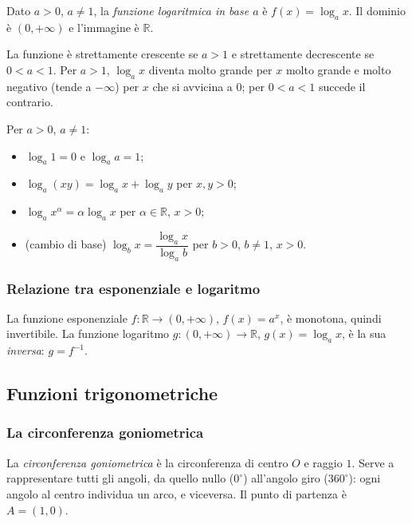 \documentclass[11pt,a4paper]{article}
\begin{document}
\begin{definizione}
Dato $a > 0$, $a \ne 1$, la \emph{funzione logaritmica in base $a$} è $f(x) = \log_a x$. Il dominio è $(0, +\infty)$ e l'immagine è $\mathbb{R}$.
\end{definizione}

La funzione è strettamente crescente se $a > 1$ e strettamente decrescente se $0 < a < 1$. Per $a > 1$, $\log_a x$ diventa molto grande per $x$ molto grande e molto negativo (tende a $-\infty$) per $x$ che si avvicina a $0$; per $0 < a < 1$ succede il contrario.

\begin{proprieta}
Per $a > 0$, $a \ne 1$:
\begin{itemize}
    \item $\log_a 1 = 0$ e $\log_a a = 1$;
    \item $\log_a (xy) = \log_a x + \log_a y$ per $x, y > 0$;
    \item $\log_a x^\alpha = \alpha \log_a x$ per $\alpha \in \mathbb{R}$, $x > 0$;
    \item (cambio di base) $\log_b x = \dfrac{\log_a x}{\log_a b}$ per $b > 0$, $b \ne 1$, $x > 0$.
\end{itemize}
\end{proprieta}

\subsubsection*{Relazione tra esponenziale e logaritmo}

La funzione esponenziale $f : \mathbb{R} \to (0,+\infty)$, $f(x) = a^x$, è monotona, quindi invertibile. La funzione logaritmo $g : (0,+\infty) \to \mathbb{R}$, $g(x) = \log_a x$, è la sua \emph{inversa}: $g = f^{-1}$.

\subsection{Funzioni trigonometriche}

\subsubsection{La circonferenza goniometrica}

La \emph{circonferenza goniometrica} è la circonferenza di centro $O$ e raggio $1$. Serve a rappresentare tutti gli angoli, da quello nullo ($0^\circ$) all'angolo giro ($360^\circ$): ogni angolo al centro individua un arco, e viceversa. Il punto di partenza è $A = (1, 0)$.
\end{document}
